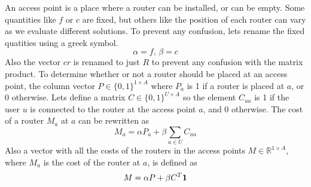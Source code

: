\documentclass[11pt,a4paper]{article}
\newcommand*\mat[1]{ \begin{pmatrix} #1 \end{pmatrix}}
\begin{document}
An access point is a place where a router can be installed, or can be empty.  
Some quantities like $f$ or $c$ are fixed, but others like the position of each 
router can vary as we evaluate different solutions. To prevent any confusion, 
lets rename the fixed quatities using a greek symbol.
%
$$ \alpha = f,\, \beta = c $$
%
Also the vector $cr$ is renamed to just $R$ to prevent any confusion with the 
matrix product.
%
To determine whether or not a router should be placed at an access point, the 
column vector $P \in \{0,1\}^{1 \times A}$ where $P_a$ is 1 if a router is 
placed at $a$, or 0 otherwise.
%
%
Lets define a matrix $C \in \{0,1\}^{U \times A}$ so the element $C_{ua}$ is 1 
if the user $u$ is connected to the router at the access point $a$, and 0 
otherwise.
The cost of a router $M_a$ at $a$ can be rewritten as
%
$$ M_a = \alpha P_a + \beta \sum_{u \in U} C_{ua} $$
%
Also a vector with all the costs of the routers in the access points $M \in 
\mathbb{R}^{1 \times A}$, where $M_a$ is the cost of the router at $a$, is 
defined as
%
$$ M = \alpha P + \beta C^T \bf{1} $$
%
%
\end{document}
